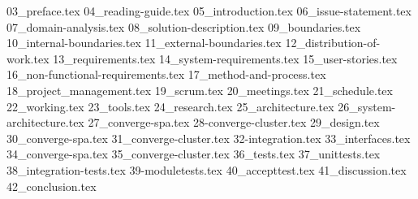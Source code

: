 {03_preface.tex}
{04_reading-guide.tex}
{05_introduction.tex}
{06_issue-statement.tex}
{07_domain-analysis.tex}
{08_solution-description.tex}
{09_boundaries.tex}
{10_internal-boundaries.tex}
{11_external-boundaries.tex}
{12_distribution-of-work.tex}
{13_requirements.tex}
{14_system-requirements.tex}
{15_user-stories.tex}
{16_non-functional-requirements.tex}
{17_method-and-process.tex}
{18_project_management.tex}
{19_scrum.tex}
{20_meetings.tex}
{21_schedule.tex}
{22_working.tex}
{23_tools.tex}
{24_research.tex}
{25_architecture.tex}
{26_system-architecture.tex}
{27_converge-spa.tex}
{28-converge-cluster.tex}
{29_design.tex}
{30_converge-spa.tex}
{31_converge-cluster.tex}
{32-integration.tex}
{33_interfaces.tex}
{34_converge-spa.tex}
{35_converge-cluster.tex}
{36_tests.tex}
{37_unittests.tex}
{38_integration-tests.tex}
{39-moduletests.tex}
{40_accepttest.tex}
{41_discussion.tex}
{42_conclusion.tex}

